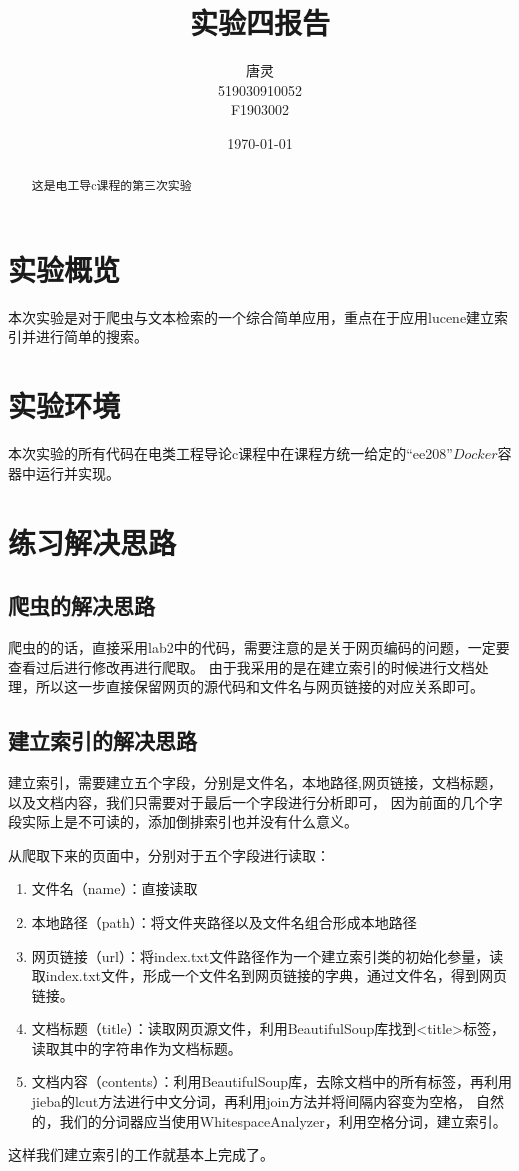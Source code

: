 \documentclass[UTF8]{ctexart}
\title{实验四报告}
\author{唐灵\\519030910052\\F1903002}
\date{\today}
\begin{document}
    \maketitle
    \begin{abstract}
        这是电工导c课程的第三次实验
    \end{abstract}
    \section{实验概览}
        本次实验是对于爬虫与文本检索的一个综合简单应用，重点在于应用lucene建立索引并进行简单的搜索。
    \section{实验环境}
    本次实验的所有代码在电类工程导论c课程中在课程方统一给定的“ee208”$Docker$容器中运行并实现。
    \section{练习解决思路}
        \subsection{爬虫的解决思路}
            爬虫的的话，直接采用lab2中的代码，需要注意的是关于网页编码的问题，一定要查看过后进行修改再进行爬取。
            由于我采用的是在建立索引的时候进行文档处理，所以这一步直接保留网页的源代码和文件名与网页链接的对应关系即可。
        \subsection{建立索引的解决思路}
            建立索引，需要建立五个字段，分别是文件名，本地路径,网页链接，文档标题，以及文档内容，我们只需要对于最后一个字段进行分析即可，
            因为前面的几个字段实际上是不可读的，添加倒排索引也并没有什么意义。\par
            从爬取下来的页面中，分别对于五个字段进行读取：
            \begin{enumerate}
                \item 文件名（name）：直接读取
                \item 本地路径（path）：将文件夹路径以及文件名组合形成本地路径
                \item 网页链接（url）：将index.txt文件路径作为一个建立索引类的初始化参量，读取index.txt文件，形成一个文件名到网页链接的字典，通过文件名，得到网页链接。
                \item 文档标题（title）：读取网页源文件，利用BeautifulSoup库找到<title>标签，读取其中的字符串作为文档标题。
                \item 文档内容（contents）：利用BeautifulSoup库，去除文档中的所有标签，再利用jieba的lcut方法进行中文分词，再利用join方法并将间隔内容变为空格，
                自然的，我们的分词器应当使用WhitespaceAnalyzer，利用空格分词，建立索引。
            \end{enumerate}
            这样我们建立索引的工作就基本上完成了。
\end{document}
